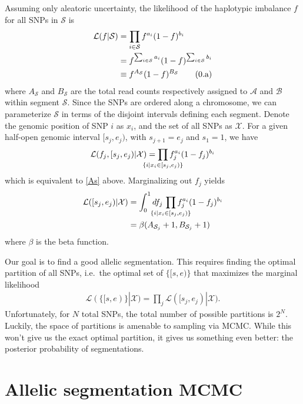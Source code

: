 \documentclass[10pt,letter]{article}
\numberwithin{equation}{section}
\newcommand{\rt}{\right}
\newcommand{\lt}{\left}
\newcommand{\btag}[1]{\addtocounter{equation}{1}\label{#1}\tag{\arabic{section}.\alph{equation}}}
\newcommand{\textop}[1]{\operatorname{#1}}
\begin{document}
Assuming only aleatoric uncertainty, the likelihood of the haplotypic imbalance $f$ for all SNPs in $\mathcal{S}$ is
\begin{align*}
\mathcal{L}(f|\mathcal{S}) &= \prod_{i\in\mathcal{S}} f^{a_i} (1 - f)^{b_i}\\
&= f^{\sum_{i\in\mathcal{S}} a_i}(1-f)^{\sum_{i\in\mathcal{S}} b_i}\\
&\equiv f^{A_\mathcal{S}}(1-f)^{B_\mathcal{S}}\btag{As}
\end{align*}
where $A_\mathcal{S}$ and $B_\mathcal{S}$ are the total read counts respectively assigned to $\mathcal{A}$ and $\mathcal{B}$ within segment $\mathcal{S}$. Since the SNPs are ordered along a chromosome, we can parameterize $\mathcal{S}$ in terms of the disjoint intervals defining each segment. Denote the genomic position of SNP $i$ as $x_i$, and the set of all SNPs as $\mathcal{X}$. For a given half-open genomic interval $[s_j,e_j)$, with $s_{j+1}=e_j$ and $s_1=1$, we have
\begin{align*}
\mathcal{L}(f_j,[s_j,e_j)|\mathcal{X})=\prod_{\mathclap{\{i|x_i\in [s_j, e_j)\}}} f_j^{a_i}(1 - f_j)^{b_i}
\end{align*}
which is equivalent to \eqref{As} above. Marginalizing out $f_j$ yields
\begin{align*}
\mathcal{L}([s_j,e_j)|\mathcal{X})&=\int_0^1 df_j\,\prod_{\mathclap{\{i|x_i\in [s_j, e_j)\}}} f_j^{a_i}(1 - f_j)^{b_i}\\
&= \beta(A_{\mathcal{S}_j}+1, B_{\mathcal{S}_j}+1)
\end{align*}
where $\beta$ is the beta function.

Our goal is to find a good allelic segmentation. This requires finding the optimal partition of all SNPs, i.e.\ the optimal set of $\{[s,e)\}$ that maximizes the marginal likelihood
\begin{align*}
\mathcal{L}(\{[s,e)\}|\mathcal{X})=\prod_j \mathcal{L}([s_j,e_j)|\mathcal{X}).
\end{align*}
Unfortunately, for $N$ total SNPs, the total number of possible partitions is $2^N$. Luckily, the space of partitions is amenable to sampling via MCMC. While this won't give us the exact optimal partition, it gives us something even better: the posterior probability of segmentations.

\section{Allelic segmentation MCMC}
\label{MCMC_section}
\end{document}
